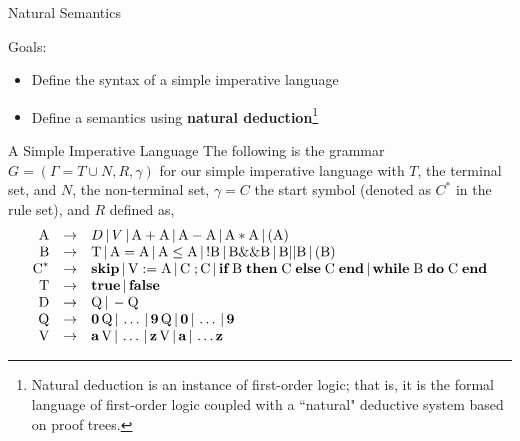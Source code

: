 \documentclass{beamer}
\begin{document}
\begin{frame}{Natural Semantics}

Goals:
\begin{itemize}
\item Define the syntax of a simple imperative language
\item Define a semantics using {\bf natural deduction}\footnote{Natural deduction is an
instance of first-order logic; that is, it is the formal language of first-order logic
coupled with a ``natural" deductive system based on proof trees.}
\end{itemize}
\end{frame}

\begin{frame}{A Simple Imperative Language}
\scriptsize
The following is the grammar
 $G=(\Gamma=T\cup N,R,\gamma)$ for our simple imperative language with $T$, the terminal set, and $N$, the non-terminal set, $\gamma=C$ the start symbol (denoted as $C^*$ in the rule set), and $R$ defined as,
{
\[
\begin{array}{rcl}
\mbox{A} &\rightarrow& D \,|\, V \,|\, \mbox{A} +\mbox{A} \,|\, \mbox{A} - \mbox{A} \,|\,
	\mbox{A} * \mbox{A}\,|\, ( \mbox{A} )\\

\mbox{B} &\rightarrow& \mbox{T}  \,|\, \mbox{A} = \mbox{A} \,|\,
	\mbox{A} \le \mbox{A} \,|\, ! \mbox{B} \,|\, \mbox{B} \&\& \mbox{B} \,|\,
	\mbox{B} || \mbox{B} \,|\, (\mbox{B})\\

\mbox{C}^* &\rightarrow& \mbox{\bf skip} \,|\, \mbox{V} := \mbox{A} \,|\,\mbox{C}\; ; \mbox{C} \,|\,
	\mbox{\bf if} \; \mbox{B}\; \mbox{\bf then}\;\mbox{C}\; \mbox{\bf else}\; \mbox{C} \; \mbox{\bf end}\,|\,
	\mbox{\bf while}\; \mbox{B}\; \mbox{\bf  do}\; \mbox{C}\; \mbox{\bf end}\\

\mbox{T} &\rightarrow& \mbox{\bf true} \,|\, \mbox{\bf false}\\

\mbox{D} &\rightarrow& \mbox{Q} \,|\, - \mbox{Q}\\

\mbox{Q} &\rightarrow& \mbox{\bf 0}\, \mbox{Q} \,|\, \ldots \,|\,  \mbox{\bf 9} \,\mbox{Q} \,|\, \mbox{\bf 0} \,|\, \ldots\,|\,\mbox{\bf 9}\\

\mbox{V} &\rightarrow& \mbox{\bf a}\,\mbox{V} \,|\, \ldots\,|\, \mbox{\bf z}\,\mbox{V} \,|\, \mbox{\bf a} \,|\, \ldots \mbox{\bf z}
\end{array}
\]
}
\end{frame}
\end{document}
